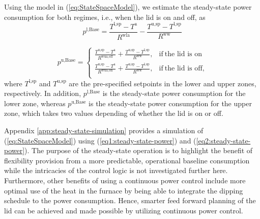 \documentclass[sigconf]{acmart}
\begin{document}
Using the model in (\ref{eq:StateSpaceModel}), we  estimate the steady-state power consumption for both regimes, i.e., when the lid is on and off, as
%
%
\begin{equation}\label{eq1:steady-state-power}
    p^{\text{l},\text{Base}} = \frac{T^{\text{l},\text{sp}} - T^{\text{a}}}{R^{\text{wla}}} - \frac{T^{\text{u},\text{sp}}-T^{\text{l},\text{sp}}}{R^{\text{ww}}}
\end{equation}

\begin{equation}\label{eq2:steady-state-power}
    p^{\text{u},\text{Base}}   =
    \begin{cases}
        \frac{T^{\text{u},\text{sp}} - T^{\text{a}}}{R^{\text{wua},\text{off}}}  + \frac{T^{\text{u},\text{sp}}-T^{\text{l},\text{sp}}}{R^{\text{ww}}}, & \text{if} \ \text{the lid is on}  \\
        \frac{T^{\text{u},\text{sp}} - T^{\text{a}}}{R^{\text{wua},\text{on}}} + \frac{T^{\text{u},\text{sp}}-T^{\text{l},\text{sp}}}{R^{\text{ww}}},   & \text{if} \ \text{the lid is off,} \\
    \end{cases}
\end{equation}
where $T^{\text{l},\text{sp}}$ and $T^{\text{u},\text{sp}}$ are the pre-specified setpoints in the lower and upper zones, respectively. In addition, $p^{\text{l},\text{Base}}$ is the steady-state power consumption for the lower zone, whereas $p^{\text{u},\text{Base}}$ is the steady-state power consumption for the upper zone, which takes two values depending of whether the lid is on or off.

Appendix \ref{app:steady-state-simulation} provides a simulation of (\ref{eq:StateSpaceModel}) using (\ref{eq1:steady-state-power}) and (\ref{eq2:steady-state-power}). The purpose of the steady-state operation is to highlight the benefit of flexibility provision from a more predictable, operational baseline consumption while the intricacies of the control logic is not investigated further here.
%
Furthermore, other benefits of using a  continuous power control include more optimal use of the heat in the furnace by being able to integrate the dipping schedule to the power consumption. Hence, smarter feed forward planning of the lid can be achieved and made possible by utilizing continuous power control.
\end{document}
